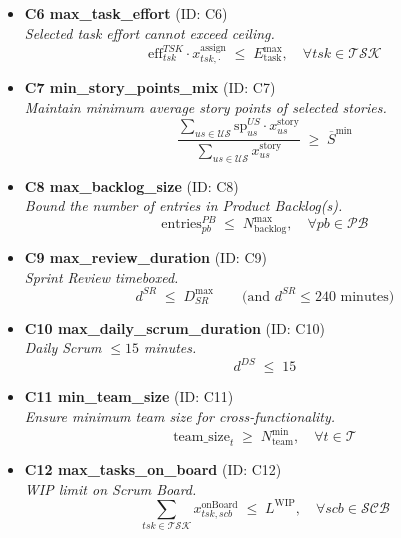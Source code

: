 \documentclass[11pt,a4paper]{article}
\begin{document}
\begin{itemize}[leftmargin=2em]
  \item \textbf{C6 max\_task\_effort} \; (ID: C6)\\
  \emph{Selected task effort cannot exceed ceiling.}\\
  \[
     \text{eff}^{TSK}_{tsk} \cdot x^{\text{assign}}_{tsk,\cdot} \;\le\; E^{\max}_{\text{task}}, \quad \forall tsk \in \mathcal{TSK}
  \]

  \item \textbf{C7 min\_story\_points\_mix} \; (ID: C7)\\
  \emph{Maintain minimum average story points of selected stories.}\\
  \[
    \frac{\sum_{us \in \mathcal{US}} \text{sp}^{US}_{us} \cdot x^{\text{story}}_{us}}{\sum_{us \in \mathcal{US}} x^{\text{story}}_{us}} \;\ge\; \overline{S}^{\min}
  \]

  \item \textbf{C8 max\_backlog\_size} \; (ID: C8)\\
  \emph{Bound the number of entries in Product Backlog(s).}\\
  \[
     \text{entries}^{PB}_{pb} \;\le\; N^{\max}_{\text{backlog}}, \quad \forall pb \in \mathcal{PB}
  \]

  \item \textbf{C9 max\_review\_duration} \; (ID: C9)\\
  \emph{Sprint Review timeboxed.}\\
  \[
     d^{SR} \;\le\; D^{\max}_{SR} \qquad \text{(and } d^{SR} \le 240\text{ minutes)}
  \]

  \item \textbf{C10 max\_daily\_scrum\_duration} \; (ID: C10)\\
  \emph{Daily Scrum $\le 15$ minutes.}\\
  \[
     d^{DS} \;\le\; 15
  \]

  \item \textbf{C11 min\_team\_size} \; (ID: C11)\\
  \emph{Ensure minimum team size for cross-functionality.}\\
  \[
     \text{team\_size}_t \;\ge\; N^{\min}_{\text{team}}, \quad \forall t \in \mathcal{T}
  \]

  \item \textbf{C12 max\_tasks\_on\_board} \; (ID: C12)\\
  \emph{WIP limit on Scrum Board.}\\
  \[
     \sum_{tsk \in \mathcal{TSK}} x^{\text{onBoard}}_{tsk,scb} \;\le\; L^{\text{WIP}}, \quad \forall scb \in \mathcal{SCB}
  \]
\end{itemize}
\end{document}
